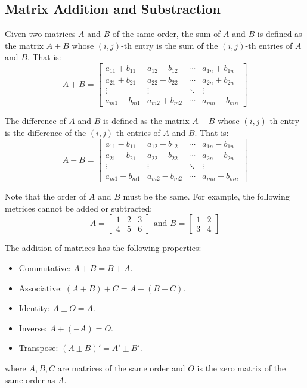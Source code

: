 \documentclass{report}
\begin{document}
\begin{multicols}{2}
    \section{Matrix Addition and Substraction}

    \doublespacing{}

    Given two matrices $A$ and $B$ of the same order, the sum of $A$ and $B$ is
    defined as the matrix $A + B$ whose $(i, j)$-th entry is the sum of the $(i,
        j)$-th entries of $A$ and $B$. That is: \[A + B = \begin{bmatrix}
            a_{11} + b_{11} & a_{12} + b_{12} & \cdots & a_{1n} + b_{1n} \\
            a_{21} + b_{21} & a_{22} + b_{22} & \cdots & a_{2n} + b_{2n} \\
            \vdots          & \vdots          & \ddots & \vdots          \\
            a_{m1} + b_{m1} & a_{m2} + b_{m2} & \cdots & a_{mn} + b_{mn}
        \end{bmatrix}\]

    The difference of $A$ and $B$ is defined as the matrix $A - B$ whose $(i,
        j)$-th entry is the difference of the $(i, j)$-th entries of $A$ and $B$. That
    is: \[A - B = \begin{bmatrix}
            a_{11} - b_{11} & a_{12} - b_{12} & \cdots & a_{1n} - b_{1n} \\
            a_{21} - b_{21} & a_{22} - b_{22} & \cdots & a_{2n} - b_{2n} \\
            \vdots          & \vdots          & \ddots & \vdots          \\
            a_{m1} - b_{m1} & a_{m2} - b_{m2} & \cdots & a_{mn} - b_{mn}
        \end{bmatrix}\]

    Note that the order of $A$ and $B$ must be the same. For example, the following
    metrices cannot be added or subtracted:
    \[
        A = \begin{bmatrix}
            1 & 2 & 3 \\
            4 & 5 & 6
        \end{bmatrix}
        \text{\ and\ }
        B = \begin{bmatrix}
            1 & 2 \\
            3 & 4
        \end{bmatrix}
    \]

    \noindent The addition of matrices has the following properties: \begin{itemize}
        \item Commutative: $A + B = B + A$.
        \item Associative: $(A + B) + C = A + (B + C)$.
        \item Identity: $A \pm O = A$.
        \item Inverse: $A + (-A) = O$.
        \item Transpose: $(A \pm B)' = A' \pm B'$.
    \end{itemize}
    where $A, B, C$ are matrices of the same order and $O$ is the zero matrix of the
    same order as $A$.


\end{multicols}
\end{document}
